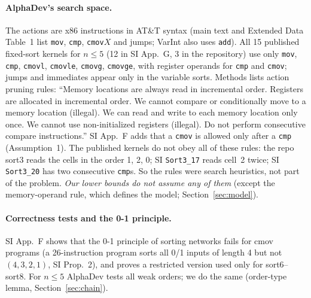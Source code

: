 \paragraph{AlphaDev's search space.}
The actions are x86 instructions in AT\&T syntax (main text and Extended Data Table~1 list \texttt{mov}, \texttt{cmp},
\texttt{cmov}$X$ and jumps; VarInt also uses \texttt{add}). All 15 published fixed-sort kernels for $n \le 5$ (12 in SI App.~G, 3 in the repository) use only
\texttt{mov}, \texttt{cmp}, \texttt{cmovl}, \texttt{cmovle}, \texttt{cmovg}, \texttt{cmovge}, with register operands for
\texttt{cmp} and \texttt{cmov}; jumps and immediates appear only in the variable sorts. Methods lists
action pruning rules: ``Memory locations are always read in incremental order. Registers are allocated in incremental order.
We cannot compare or conditionally move to a memory location (illegal). We can read and write to each memory location only
once. We cannot use non-initialized registers (illegal). Do not perform consecutive compare instructions.'' SI App.~F adds
that a \texttt{cmov} is allowed only after a \texttt{cmp} (Assumption~1). The published kernels do not obey all of these
rules: the repo sort3 reads the cells in the order 1, 2, 0; SI \texttt{Sort3\_17} reads cell~2 twice; SI \texttt{Sort3\_20}
has two consecutive \texttt{cmp}s. So the rules were search heuristics, not part of the problem. \emph{Our lower bounds do not
assume any of them} (except the memory-operand rule, which defines the model; Section~\ref{sec:model}).

\paragraph{Correctness tests and the 0-1 principle.}
SI App.~F shows that the 0-1 principle of sorting networks fails for cmov programs (a 26-instruction program sorts all
0/1 inputs of length 4 but not $(4,3,2,1)$, SI Prop.~2), and proves a restricted version used only for sort6--sort8.
For $n \le 5$ AlphaDev tests all weak orders; we do the same (order-type lemma, Section~\ref{sec:chain}).

